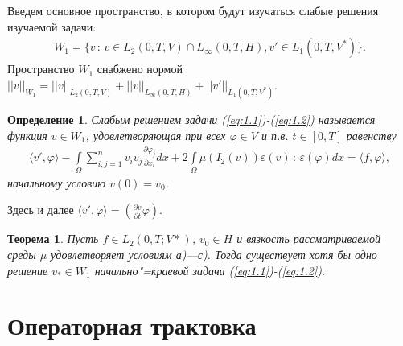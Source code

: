 \documentclass[14pt, a4paper]{extarticle}
\newtheorem{definition}{Определение}[section]
\newtheorem{theorem}{Теорема}[section]
\numberwithin{equation}{section}
\begin{document}
    Введем основное пространство, в котором будут изучаться слабые решения изучаемой задачи:
    \begin{equation*}
        \begin{gathered}
            W_1 = \{v\, : \,v \in L_2(0,T,V) \cap L_\infty(0,T,H), v' \in L_1(0,T,V^*)\}.
        \end{gathered}
    \end{equation*}
    Пространство $W_1$ снабжено нормой $||v||_{W_1} = ||v||_{L_2(0,T,V)} + ||v||_{L_\infty(0,T,H)} + ||v'||_{L_1(0,T,V^*)}$.
    \begin{definition}
        Слабым решением задачи (\ref{eq:1.1})-(\ref{eq:1.2}) называется функция $v \in W_1$,
        удовлетворяющая при всех $\varphi \in V$ и п.в. $t \in [0,T]$ равенству
        \begin{equation}\label{eq:2.1}
            \begin{gathered}
                \langle v', \varphi \rangle - \int\limits_\Omega \sum\limits_{i,j=1}^n v_i v_j
                \frac{\partial\varphi_j}{\partial x_i}dx + 2\int\limits_\Omega
                \mu(I_2(v))\varepsilon(v)\, : \,\varepsilon(\varphi)dx = \langle f, \varphi \rangle,
            \end{gathered}
        \end{equation}
        \noindent начальному условию $v(0) = v_0$.
    \end{definition}

    Здесь и далее $\langle v', \varphi \rangle = (\frac{\partial v}{\partial t} \varphi)$.

    \begin{theorem}\label{th:2.1}
        Пусть $f \in L_2(0,T;V*)$, $v_0 \in H$ и вязкость рассматриваемой среды 
        $\mu$ удовлетворяет условиям а)---с). Тогда существует хотя бы одно решение
        $v_* \in W_1$ начально"=краевой задачи (\ref{eq:1.1})-(\ref{eq:1.2}).
    \end{theorem}


    \section{Операторная трактовка}
\end{document}
